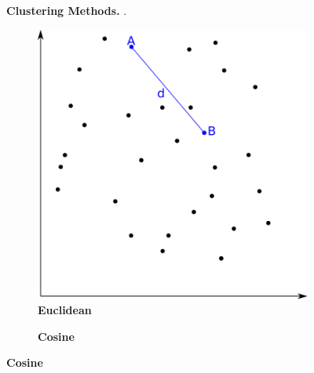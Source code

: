 \begin{figure}
\begin{adjustbox}{minipage=\dimexpr{}\fboxrule,fbox}
\begin{subfigure}[b]{0.475\textwidth}
        \end{subfigure}
    \end{adjustbox}
    \caption[Clustering Methods]{\textbf{Clustering Methods.} .}
    \label{fig:Methods}
\end{figure}

\blindtext

\begin{figure}
    \centering
    \begin{adjustbox}{minipage=\dimexpr{}\fboxrule,fbox}
        \begin{subfigure}[b]{0.475\textwidth}
            \caption[Euclidean]{\textbf{Euclidean}}
            \label{subfig:Euclidean}
            \includegraphics[width=\textwidth]{Graphics/Euclidean.pdf}
        \end{subfigure}
        \hfill
        \begin{subfigure}[b]{0.475\textwidth}
            \caption[Cosine]{\textbf{Cosine}}

\end{subfigure}
\end{adjustbox}
\end{figure}

